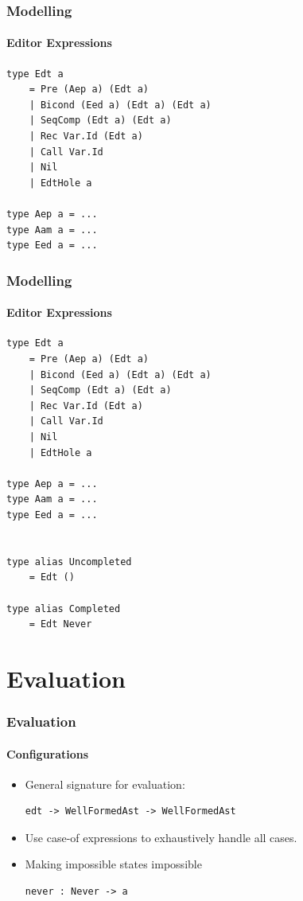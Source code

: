 \documentclass{beamer}
\begin{document}
\begin{frame}[fragile]
    \frametitle{Modelling}
    \framesubtitle{Editor Expressions}

\begin{lstlisting}
type Edt a
    = Pre (Aep a) (Edt a)
    | Bicond (Eed a) (Edt a) (Edt a)
    | SeqComp (Edt a) (Edt a)
    | Rec Var.Id (Edt a)
    | Call Var.Id
    | Nil
    | EdtHole a

type Aep a = ...
type Aam a = ...
type Eed a = ...
\end{lstlisting}
\end{frame}

\begin{frame}[fragile]
    \frametitle{Modelling}
    \framesubtitle{Editor Expressions}

\begin{lstlisting}
type Edt a
    = Pre (Aep a) (Edt a)
    | Bicond (Eed a) (Edt a) (Edt a)
    | SeqComp (Edt a) (Edt a)
    | Rec Var.Id (Edt a)
    | Call Var.Id
    | Nil
    | EdtHole a

type Aep a = ...
type Aam a = ...
type Eed a = ...


type alias Uncompleted
    = Edt ()

type alias Completed
    = Edt Never
\end{lstlisting}
\end{frame}

\section{Evaluation}

\begin{frame}[fragile]
    \frametitle{Evaluation}
    \framesubtitle{Configurations}

    \begin{itemize}
        \item General signature for evaluation:
\begin{lstlisting}
edt -> WellFormedAst -> WellFormedAst
\end{lstlisting}
            \pause
        \item Use case-of expressions to exhaustively handle all cases.
            \pause
        \item Making impossible states impossible
\begin{lstlisting}
never : Never -> a
\end{lstlisting}
    \end{itemize}
\end{frame}
\end{document}

